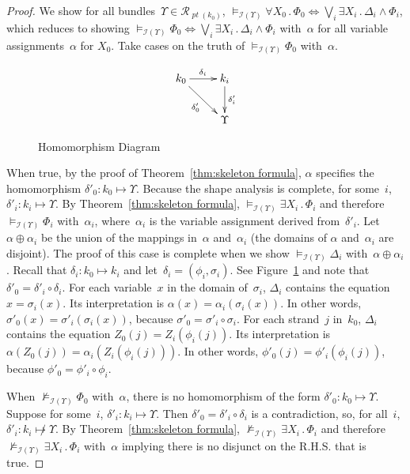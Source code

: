 \documentclass[titlepage,12pt]{article}
\newcommand{\fn}[1]{\ensuremath{\operatorname{\mathit{#1}}}}
\newcommand{\typ}{\mathbin:}
\newcommand{\all}[1]{\forall#1\mathpunct.}
\newcommand{\some}[1]{\exists#1\mathpunct.}
\newcommand{\run}{\mathcal{R}}
\newcommand{\pt}{\fn{pt}}
\newcommand{\interp}{\mathcal{I}}
\begin{document}
\begin{proof}
We show for all bundles~$\Upsilon\in\run_{\pt(k_0)}$,
$\models_{\interp(\Upsilon)}
\all{X_0}\Phi_0\Longleftrightarrow\bigvee_i\some{X_i}\Delta_i\wedge\Phi_i$,
which reduces to showing $\models_{\interp(\Upsilon)}
\Phi_0\Longleftrightarrow\bigvee_i\some{X_i}\Delta_i\wedge\Phi_i$
with~$\alpha$ for all variable assignments~$\alpha$ for $X_0$.  Take
cases on the truth of $\models_{\interp(\Upsilon)}\Phi_0$
with~$\alpha$.

\begin{figure}
$$\xymatrix{k_0\ar[r]^{\delta_i}\ar[dr]_{\delta'_0}&k_i\ar[d]^{\delta'_i} \\
&\Upsilon}$$
\caption{Homomorphism Diagram}\label{fig:homomorphism}
\end{figure}

When true, by the proof of Theorem~\ref{thm:skeleton formula},
$\alpha$ specifies the homomorphism $\delta'_0\typ
k_0\mapsto\Upsilon$.  Because the shape analysis is complete, for
some~$i$, $\delta'_i\typ k_i\mapsto\Upsilon$.  By
Theorem~\ref{thm:skeleton formula}, $\models_{\interp(\Upsilon)}
\some{X_i}\Phi_i$ and therefore $\models_{\interp(\Upsilon)} \Phi_i$
with~$\alpha_i$, where~$\alpha_i$ is the variable assignment derived
from~$\delta'_i$.  Let $\alpha\oplus\alpha_i$ be the union of the
mappings in~$\alpha$ and~$\alpha_i$ (the domains of $\alpha$
and~$\alpha_i$ are disjoint).  The proof of this case is complete when
we show $\models_{\interp(\Upsilon)} \Delta_i$
with~$\alpha\oplus\alpha_i$.  Recall that $\delta_i\typ k_0\mapsto
k_i$ and let~$\delta_i=(\phi_i,\sigma_i)$.  See
Figure~\ref{fig:homomorphism} and note that
$\delta'_0=\delta'_i\circ\delta_i$.  For each variable~$x$ in the
domain of~$\sigma_i$, $\Delta_i$ contains the equation
$x=\sigma_i(x)$.  Its interpretation is
$\alpha(x)=\alpha_i(\sigma_i(x))$.  In other words,
$\sigma'_0(x)=\sigma'_i(\sigma_i(x))$, because
$\sigma'_0=\sigma'_i\circ\sigma_i$.  For each strand~$j$ in~$k_0$,
$\Delta_i$ contains the equation $Z_0(j)=Z_i(\phi_i(j))$.  Its
interpretation is $\alpha(Z_0(j))=\alpha_i(Z_i(\phi_i(j)))$.  In other
words, $\phi'_0(j)=\phi'_i(\phi_i(j))$, because
$\phi'_0=\phi'_i\circ\phi_i$.

When $\not\models_{\interp(\Upsilon)}\Phi_0$ with~$\alpha$, there is
no homomorphism of the form $\delta'_0\typ k_0\mapsto\Upsilon$.
Suppose for some~$i$, $\delta'_i\typ k_i\mapsto\Upsilon$.  Then
$\delta'_0=\delta'_i\circ\delta_i$ is a contradiction, so, for
all~$i$, $\delta'_i\typ k_i\not\mapsto\Upsilon$.  By
Theorem~\ref{thm:skeleton formula}, $\not\models_{\interp(\Upsilon)}
\some{X_i}\Phi_i$ and therefore $\not\models_{\interp(\Upsilon)}
\some{X_i}\Phi_i$ with~$\alpha$ implying there is no disjunct on the
R.H.S. that is true.
\end{proof}
\end{document}
